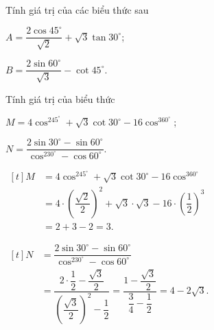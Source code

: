 \begin{vd}
	Tính giá trị của các biểu thức sau
	\begin{enumEX}{2}
	\item $A=\dfrac{2\cos 45^\circ}{\sqrt{2}}+\sqrt{3}\tan 30^\circ$;
	\item $B=\dfrac{2\sin 60^\circ}{\sqrt{3}}-\cot 45^\circ$.
	\end{enumEX}
\end{vd}
\begin{vd}%
	Tính giá trị của biểu thức
	\begin{enumEX}{2}
	\item $M= 4\cos^245^{\circ} + \sqrt{3}\cot30^{\circ} - 16\cos^360^{\circ}$;
	\item $N =\dfrac{2\sin 30^{\circ} - \sin 60^{\circ}}{\cos^230^{\circ} - \cos 60^{\circ}}$.
	\end{enumEX}
	\loigiai
	{
	\begin{enumEX}{2}
	\item \allowdisplaybreaks $\begin{aligned}[t]
	M &= 4\cos^245^{\circ} + \sqrt{3}\cot30^{\circ} - 16\cos^360^{\circ}\\
	&= 4\cdot\left(\dfrac{\sqrt{2}}{2}\right)^2 + \sqrt{3}\cdot\sqrt{3} - 16\cdot\left(\dfrac{1}{2}\right)^3\\
	&= 2 + 3 - 2 = 3.
	\end{aligned}$
	\item \allowdisplaybreaks $\begin{aligned}[t]
	N &=\dfrac{2\sin 30^{\circ} - \sin 60^{\circ}}{\cos^230^{\circ} - \cos 60^{\circ}}\\
	&= \dfrac{2\cdot\dfrac{1}{2} - \dfrac{\sqrt{3}}{2}}{\left(\dfrac{\sqrt{3}}{2}\right)^2 - \dfrac{1}{2}}=\dfrac{1 - \dfrac{\sqrt{3}}{2}}{\dfrac{3}{4} - \dfrac{1}{2}}= 4 - 2\sqrt{3}.
	\end{aligned}$
	\end{enumEX}
	}
\end{vd}
